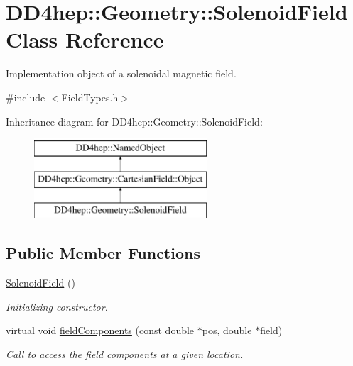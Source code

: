 \hypertarget{class_d_d4hep_1_1_geometry_1_1_solenoid_field}{}\section{D\+D4hep\+:\+:Geometry\+:\+:Solenoid\+Field Class Reference}
\label{class_d_d4hep_1_1_geometry_1_1_solenoid_field}


Implementation object of a solenoidal magnetic field.  




{\ttfamily \#include $<$Field\+Types.\+h$>$}

Inheritance diagram for D\+D4hep\+:\+:Geometry\+:\+:Solenoid\+Field\+:\begin{figure}[H]
\begin{center}
\leavevmode
\includegraphics[height=3.000000cm]{class_d_d4hep_1_1_geometry_1_1_solenoid_field}
\end{center}
\end{figure}
\subsection*{Public Member Functions}
\begin{DoxyCompactItemize}
\item 
\hyperlink{class_d_d4hep_1_1_geometry_1_1_solenoid_field_a882732fe549f63858d40cca4c5133bf9}{Solenoid\+Field} ()
\begin{DoxyCompactList}\small\item\em Initializing constructor. \end{DoxyCompactList}\item 
virtual void \hyperlink{class_d_d4hep_1_1_geometry_1_1_solenoid_field_aef35ec6873e2227025d3b770bdbdc1e1}{field\+Components} (const double $\ast$pos, double $\ast$field)
\begin{DoxyCompactList}\small\item\em Call to access the field components at a given location. \end{DoxyCompactList}\end{DoxyCompactItemize}
